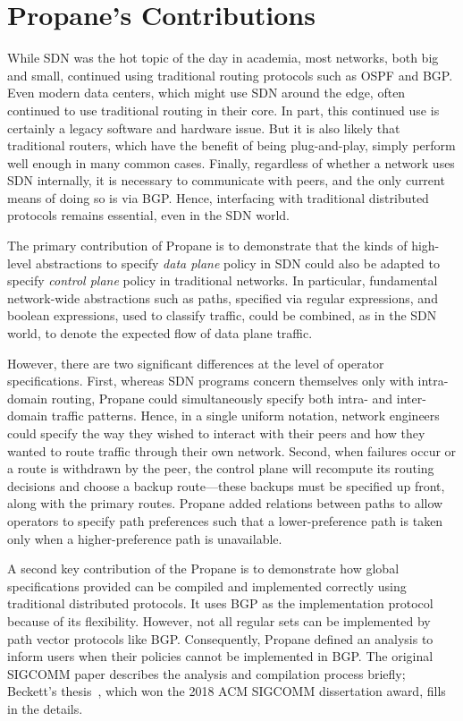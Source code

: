 \documentclass[10pt]{sigalternate052015}
\begin{document}
\section{Propane's Contributions}

While SDN was the hot topic of the day in academia,
most networks, both big and small, continued using
traditional routing protocols such as
OSPF and BGP.  Even modern data centers, which might use SDN around
the edge, often continued to use traditional routing in their
core.  In part, this continued use is certainly
a legacy software and hardware issue.  But it is also likely that
traditional routers, which have the benefit of being plug-and-play,
simply perform well enough in many common
cases.  Finally, regardless of whether a network uses SDN internally, it is necessary to communicate with peers, and the only
current means of doing so is via BGP.  Hence, interfacing with
traditional distributed protocols remains essential, even in the SDN
world.

The primary contribution of Propane is to demonstrate that the kinds
of high-level abstractions to specify \emph{data plane} policy in SDN could also be adapted to specify
\emph{control plane} policy in traditional networks. In particular,
fundamental network-wide abstractions such as paths, specified via
regular expressions, and boolean expressions, used to
classify traffic, could be combined, as in the SDN world, to denote
the expected flow of data plane traffic.  

However, there are two significant
differences at the level of operator specifications.  First, whereas SDN
programs concern themselves only with intra-domain routing,
Propane could simultaneously specify
both intra- and inter-domain traffic patterns.  Hence, in a single
uniform
notation, network engineers could specify the way they wished to
interact with their peers and how they wanted to route traffic through
their own network.  Second, when failures
occur or a route is withdrawn by the peer, the control plane will recompute its routing decisions and
choose a backup route---these backups must be specified up front,
along with the primary routes.  Propane added relations between paths
to allow operators to specify path preferences such that a lower-preference path is taken only when a higher-preference path is unavailable.

A second key contribution of the Propane is to
demonstrate how global specifications provided can be compiled
and implemented correctly using traditional distributed protocols.  
It uses BGP as the
implementation protocol because of its flexibility.  However, not all regular sets can be implemented by path vector protocols
like BGP.  Consequently, Propane defined an analysis to inform users when
their policies cannot be implemented in BGP.  The original
SIGCOMM paper describes the analysis and compilation process briefly;
Beckett's thesis~\cite{beckett:thesis}, which won the 2018 ACM SIGCOMM
dissertation award, fills in the details.
\end{document}
